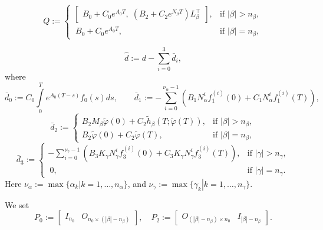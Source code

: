 \documentclass[preprint,12pt]{elsarticle}
\numberwithin{equation}{section}
\theoremstyle{definition}
\begin{document}
\begin{equation}\label{Q}
    Q :=      \begin{cases}
        \begin{bmatrix}
            B_0 + C_0 e^{A_0 T}, \; (B_2 + C_2 e^{N_{\beta} T}) L_\beta^\top
        \end{bmatrix}, &\text{if   } |\beta|>n_\beta,\\
        ~B_0 + C_0 e^{A_0 T},&\text{if   } |\beta|=n_\beta,
    \end{cases}   
\end{equation}

\begin{equation}\label{d_hat}
    \widehat{d} := d - \sum\limits_{i=0}^3 \bar{d}_i,
\end{equation}
where
\begin{equation*}
    \bar{d}_0:=C_0\int\limits_0^T e^{A_0(T-s)}f_0(s)ds,\qquad 
    \bar{d}_1:=-\sum\limits_{i=0}^{\nu_{\alpha}-1}\left(B_1 N_{\alpha}^i f_1^{(i)}(0)+C_1N_{\alpha}^i f_1^{(i)}(T)\right),
\end{equation*}
\begin{equation*}
    \bar{d}_2:=\begin{cases}B_2M_{\beta}\widetilde{\varphi}(0)+C_2 \widetilde{h}_{\beta}(T; \widetilde{\varphi}(T)),&\text{if   }|\beta|>n_\beta,\\
    B_2\widetilde{\varphi}(0)+C_2  \widetilde{\varphi}(T),&\text{if   }|\beta|=n_\beta,
    \end{cases}
\end{equation*}
\begin{equation*}
\bar{d}_3:=\begin{cases}
    -\sum\limits_{i=0}^{\nu_{\gamma}-1}\left(B_3K_{\gamma}N_{\gamma}^i f_3^{(i)}(0)+C_3K_{\gamma}N_{\gamma}^i f_3^{(i)}(T)\right),&\text{if   }|\gamma|>n_\gamma,\\
    ~0, & \text{if   } |\gamma|=n_\gamma.
\end{cases}
\end{equation*}
Here $\nu_{\alpha}:=\max \{\left.\alpha_k\right\vert k=1,\ldots,n_{\alpha}\}$, and $    \nu_{\gamma}:=\max \{\left.\gamma_k\right\vert k=1,\ldots,n_{\gamma}\}$.

We set \[
P_0 := \begin{bmatrix} I_{n_0} & O_{n_0 \times (|\beta| - n_{\beta})} \end{bmatrix}, \quad
P_2 := \begin{bmatrix} O_{(|\beta| - n_{\beta}) \times n_0} & I_{|\beta| - n_{\beta}} \end{bmatrix}.
\]
\end{document}
